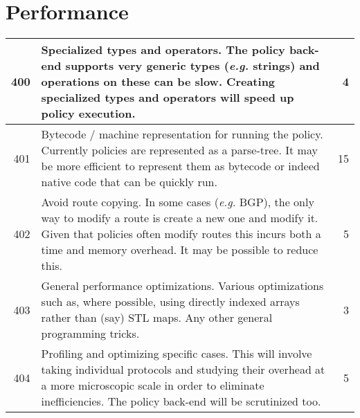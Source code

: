 \documentclass[letterpaper]{article}
\begin{document}
\section{Performance}
\begin{center}
\tabletail{
\hline
}
\begin{supertabular}{|r |p{12cm} |r|}
\hline

400 &
Specialized types and operators.  The policy back-end supports very generic types
({\em e.g.} strings) and operations on these can be slow.  Creating specialized
types and operators will speed up policy execution.
& 4 \\
\hline

401 &
Bytecode / machine representation for running the policy.  Currently policies
are represented as a parse-tree.  It may be more efficient to represent them as
bytecode or indeed native code that can be quickly run.
& 15 \\
\hline

402 &
Avoid route copying.  In some cases ({\em e.g.} BGP), the only way to modify a
route is create a new one and modify it.  Given that policies often modify
routes this incurs both a time and memory overhead.  It may be possible to
reduce this.
& 5 \\
\hline

403 &
General performance optimizations.  Various optimizations such as, where
possible, using directly indexed arrays rather than (say) STL maps.  Any other
general programming tricks.
& 3 \\
\hline

404 &
Profiling and optimizing specific cases.  This will involve taking individual
protocols and studying their overhead at a more microscopic scale in order to
eliminate inefficiencies.  The policy back-end will be scrutinized too.
& 5  \\

\end{supertabular}
\end{center}
\end{document}
